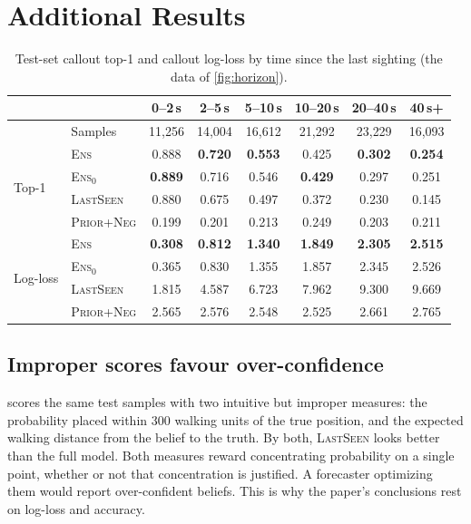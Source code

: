 \documentclass[11pt]{article}
\newcommand{\model}[1]{\textsc{#1}}
\newcommand{\1}{\mathbb{1}}
\begin{document}
\section{Additional Results}
\label{app:tables}

\begin{table}[H]
\centering
\caption{Test-set callout top-1 and callout log-loss by time since the last sighting (the data of \cref{fig:horizon}).}
\label{tab:horizon}
\small
\begin{tabular}{@{}llcccccc@{}}
\toprule
 & & 0--2\,s & 2--5\,s & 5--10\,s & 10--20\,s & 20--40\,s & 40\,s+ \\
\midrule
 & Samples & 11{,}256 & 14{,}004 & 16{,}612 & 21{,}292 & 23{,}229 & 16{,}093 \\
\midrule
\multirow{4}{*}{Top-1} & \model{Ens} & 0.888 & \textbf{0.720} & \textbf{0.553} & 0.425 & \textbf{0.302} & \textbf{0.254} \\
 & \model{Ens$_0$} & \textbf{0.889} & 0.716 & 0.546 & \textbf{0.429} & 0.297 & 0.251 \\
 & \model{LastSeen} & 0.880 & 0.675 & 0.497 & 0.372 & 0.230 & 0.145 \\
 & \model{Prior+Neg} & 0.199 & 0.201 & 0.213 & 0.249 & 0.203 & 0.211 \\
\midrule
\multirow{4}{*}{Log-loss} & \model{Ens} & \textbf{0.308} & \textbf{0.812} & \textbf{1.340} & \textbf{1.849} & \textbf{2.305} & \textbf{2.515} \\
 & \model{Ens$_0$} & 0.365 & 0.830 & 1.355 & 1.857 & 2.345 & 2.526 \\
 & \model{LastSeen} & 1.815 & 4.587 & 6.723 & 7.962 & 9.300 & 9.669 \\
 & \model{Prior+Neg} & 2.565 & 2.576 & 2.548 & 2.525 & 2.661 & 2.765 \\
\bottomrule
\end{tabular}
\end{table}

\subsection{Improper scores favour over-confidence}
\label{app:improper}
 scores the same test samples with two intuitive but improper measures: the probability placed within 300 walking units of the true position, and the expected walking distance from the belief to the truth. By both, \model{LastSeen} looks better than the full model. Both measures reward concentrating probability on a single point, whether or not that concentration is justified. A forecaster optimizing them would report over-confident beliefs. This is why the paper's conclusions rest on log-loss and accuracy.
\end{document}
